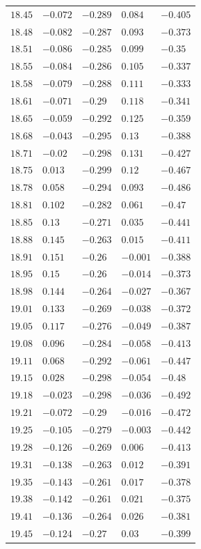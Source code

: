 \begin{table}[h]
\begin{tabular}{rllll}
$18.45$&$-0.072$&$-0.289$&$0.084$&$-0.405$\\
$18.48$&$-0.082$&$-0.287$&$0.093$&$-0.373$\\
$18.51$&$-0.086$&$-0.285$&$0.099$&$-0.35$\\
$18.55$&$-0.084$&$-0.286$&$0.105$&$-0.337$\\
$18.58$&$-0.079$&$-0.288$&$0.111$&$-0.333$\\
$18.61$&$-0.071$&$-0.29$&$0.118$&$-0.341$\\
$18.65$&$-0.059$&$-0.292$&$0.125$&$-0.359$\\
$18.68$&$-0.043$&$-0.295$&$0.13$&$-0.388$\\
$18.71$&$-0.02$&$-0.298$&$0.131$&$-0.427$\\
$18.75$&$0.013$&$-0.299$&$0.12$&$-0.467$\\
$18.78$&$0.058$&$-0.294$&$0.093$&$-0.486$\\
$18.81$&$0.102$&$-0.282$&$0.061$&$-0.47$\\
$18.85$&$0.13$&$-0.271$&$0.035$&$-0.441$\\
$18.88$&$0.145$&$-0.263$&$0.015$&$-0.411$\\
$18.91$&$0.151$&$-0.26$&$-0.001$&$-0.388$\\
$18.95$&$0.15$&$-0.26$&$-0.014$&$-0.373$\\
$18.98$&$0.144$&$-0.264$&$-0.027$&$-0.367$\\
$19.01$&$0.133$&$-0.269$&$-0.038$&$-0.372$\\
$19.05$&$0.117$&$-0.276$&$-0.049$&$-0.387$\\
$19.08$&$0.096$&$-0.284$&$-0.058$&$-0.413$\\
$19.11$&$0.068$&$-0.292$&$-0.061$&$-0.447$\\
$19.15$&$0.028$&$-0.298$&$-0.054$&$-0.48$\\
$19.18$&$-0.023$&$-0.298$&$-0.036$&$-0.492$\\
$19.21$&$-0.072$&$-0.29$&$-0.016$&$-0.472$\\
$19.25$&$-0.105$&$-0.279$&$-0.003$&$-0.442$\\
$19.28$&$-0.126$&$-0.269$&$0.006$&$-0.413$\\
$19.31$&$-0.138$&$-0.263$&$0.012$&$-0.391$\\
$19.35$&$-0.143$&$-0.261$&$0.017$&$-0.378$\\
$19.38$&$-0.142$&$-0.261$&$0.021$&$-0.375$\\
$19.41$&$-0.136$&$-0.264$&$0.026$&$-0.381$\\
$19.45$&$-0.124$&$-0.27$&$0.03$&$-0.399$\\

\end{tabular}
\end{table}
